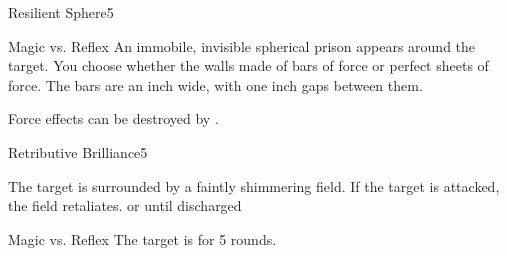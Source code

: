 \begin{spellfooter}
\begin{spellsection}{Resilient Sphere}{5}
    \begin{spellheader}
        \spellrng{\rngmed}
    \end{spellheader}
    \begin{spellcontent}
        \begin{spelltargetinginfo}
        \end{spelltargetinginfo}
        \begin{spelleffects}
            \begin{spellattack}{Magic vs. Reflex}
                \spellsuccess An immobile, invisible spherical prison appears around the target. You choose whether the walls made of bars of force or perfect sheets of force. The bars are an inch wide, with one inch gaps between them.
            \end{spellattack}
            \spelldur \durshort \dismissable
        \end{spelleffects}
    \end{spellcontent}
    \begin{spellfooter}
        \spellnotes Force effects can be destroyed by .
    \end{spellfooter}
\end{spellsection}

\begin{spellsection}{Retributive Brilliance}{5}
    \begin{spellheader}
    \end{spellheader}
    \begin{spellcontent}
        \begin{spelltargetinginfo}
        \end{spelltargetinginfo}
        \begin{spelleffects}
            \spelleffect The target is surrounded by a faintly shimmering field. If the target is attacked, the field retaliates.
            \spelldur \durshort or until discharged
        \end{spelleffects}
    \end{spellcontent}
    \begin{spellsubcontent}
        \begin{spelltargetinginfo}
        \end{spelltargetinginfo}
        \begin{spelleffects}
            \begin{spellattack}{Magic vs. Reflex}
                \spellsuccess The target is \dazzled for 5 rounds.


\end{spellattack}
\end{spelleffects}
\end{spellsubcontent}
\end{spellsection}
\end{spellfooter}

